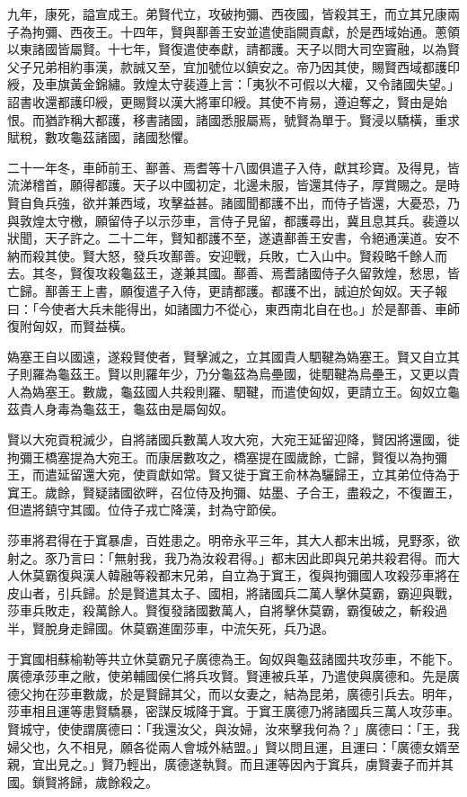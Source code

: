 \begin{pinyinscope}
九年，康死，謚宣成王。弟賢代立，攻破拘彌、西夜國，皆殺其王，而立其兄康兩子為拘彌、西夜王。十四年，賢與鄯善王安並遣使詣闕貢獻，於是西域始通。蔥領以東諸國皆屬賢。十七年，賢復遣使奉獻，請都護。天子以問大司空竇融，以為賢父子兄弟相約事漢，款誠又至，宜加號位以鎮安之。帝乃因其使，賜賢西域都護印綬，及車旗黃金錦繡。敦煌太守裴遵上言：「夷狄不可假以大權，又令諸國失望。」詔書收還都護印綬，更賜賢以漢大將軍印綬。其使不肯易，遵迫奪之，賢由是始恨。而猶詐稱大都護，移書諸國，諸國悉服屬焉，號賢為單于。賢浸以驕橫，重求賦稅，數攻龜茲諸國，諸國愁懼。

二十一年冬，車師前王、鄯善、焉耆等十八國俱遣子入侍，獻其珍寶。及得見，皆流涕稽首，願得都護。天子以中國初定，北邊未服，皆還其侍子，厚賞賜之。是時賢自負兵強，欲并兼西域，攻擊益甚。諸國聞都護不出，而侍子皆還，大憂恐，乃與敦煌太守檄，願留侍子以示莎車，言侍子見留，都護尋出，冀且息其兵。裴遵以狀聞，天子許之。二十二年，賢知都護不至，遂遺鄯善王安書，令絕通漢道。安不納而殺其使。賢大怒，發兵攻鄯善。安迎戰，兵敗，亡入山中。賢殺略千餘人而去。其冬，賢復攻殺龜茲王，遂兼其國。鄯善、焉耆諸國侍子久留敦煌，愁思，皆亡歸。鄯善王上書，願復遣子入侍，更請都護。都護不出，誠迫於匈奴。天子報曰：「今使者大兵未能得出，如諸國力不從心，東西南北自在也。」於是鄯善、車師復附匈奴，而賢益橫。

媯塞王自以國遠，遂殺賢使者，賢擊滅之，立其國貴人駟鞬為媯塞王。賢又自立其子則羅為龜茲王。賢以則羅年少，乃分龜茲為烏壘國，徙駟鞬為烏壘王，又更以貴人為媯塞王。數歲，龜茲國人共殺則羅、駟鞬，而遣使匈奴，更請立王。匈奴立龜茲貴人身毒為龜茲王，龜茲由是屬匈奴。

賢以大宛貢稅滅少，自將諸國兵數萬人攻大宛，大宛王延留迎降，賢因將還國，徙拘彌王橋塞提為大宛王。而康居數攻之，橋塞提在國歲餘，亡歸，賢復以為拘彌王，而遣延留還大宛，使貢獻如常。賢又徙于窴王俞林為驪歸王，立其弟位侍為于窴王。歲餘，賢疑諸國欲畔，召位侍及拘彌、姑墨、子合王，盡殺之，不復置王，但遣將鎮守其國。位侍子戎亡降漢，封為守節侯。

莎車將君得在于窴暴虐，百姓患之。明帝永平三年，其大人都末出城，見野豕，欲射之。豕乃言曰：「無射我，我乃為汝殺君得。」都末因此即與兄弟共殺君得。而大人休莫霸復與漢人韓融等殺都末兄弟，自立為于窴王，復與拘彌國人攻殺莎車將在皮山者，引兵歸。於是賢遣其太子、國相，將諸國兵二萬人擊休莫霸，霸迎與戰，莎車兵敗走，殺萬餘人。賢復發諸國數萬人，自將擊休莫霸，霸復破之，斬殺過半，賢脫身走歸國。休莫霸進圍莎車，中流矢死，兵乃退。

于窴國相蘇榆勒等共立休莫霸兄子廣德為王。匈奴與龜茲諸國共攻莎車，不能下。廣德承莎車之敝，使弟輔國侯仁將兵攻賢。賢連被兵革，乃遣使與廣德和。先是廣德父拘在莎車數歲，於是賢歸其父，而以女妻之，結為昆弟，廣德引兵去。明年，莎車相且運等患賢驕暴，密謀反城降于窴。于窴王廣德乃將諸國兵三萬人攻莎車。賢城守，使使謂廣德曰：「我還汝父，與汝婦，汝來擊我何為？」廣德曰：「王，我婦父也，久不相見，願各從兩人會城外結盟。」賢以問且運，且運曰：「廣德女婿至親，宜出見之。」賢乃輕出，廣德遂執賢。而且運等因內于窴兵，虜賢妻子而并其國。鎖賢將歸，歲餘殺之。


\end{pinyinscope}
